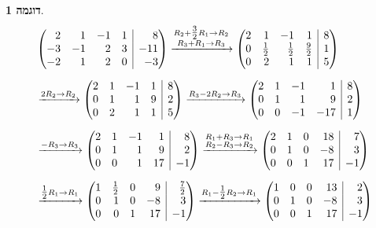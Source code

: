 \documentclass[12pt]{report}
\theoremstyle{plain}
\theoremstyle{definition}
\newtheorem{example}{דוגמה}[chapter]
\newcommand{\0}{\mathbf{0}}
\begin{document}
\begin{example}
$$
\begin{aligned}
&\left(\begin{array}{@{}rrrr|r@{}}
2 & 1 & -1 & 1 & 8 \\
-3 & -1 & 2 & 3 & -11 \\
-2 & 1 & 2 & 0 & -3
\end{array}\right)
\xrightarrow{\substack{R_2 + \tfrac{3}{2} R_1 \to R_2 \\ R_3 + R_1 \to R_3}}
\left(\begin{array}{@{}rrrr|r@{}}
2 & 1 & -1 & 1 & 8 \\
0 & \tfrac{1}{2} & \tfrac{1}{2} & \tfrac{9}{2} & 1 \\
0 & 2 & 1 & 1 & 5
\end{array}\right) \\[6pt]
&\xrightarrow{2 R_2 \to R_2}
\left(\begin{array}{@{}rrrr|r@{}}
2 & 1 & -1 & 1 & 8 \\
0 & 1 & 1 & 9 & 2 \\
0 & 2 & 1 & 1 & 5
\end{array}\right)
\xrightarrow{R_3 - 2 R_2 \to R_3}
\left(\begin{array}{@{}rrrr|r@{}}
2 & 1 & -1 & 1 & 8 \\
0 & 1 & 1 & 9 & 2 \\
0 & 0 & -1 & -17 & 1
\end{array}\right) \\[6pt]
&\xrightarrow{-R_3 \to R_3}
\left(\begin{array}{@{}rrrr|r@{}}
2 & 1 & -1 & 1 & 8 \\
0 & 1 & 1 & 9 & 2 \\
0 & 0 & 1 & 17 & -1
\end{array}\right)
\xrightarrow{\substack{R_1 + R_3 \to R_1 \\ R_2 - R_3 \to R_2}}
\left(\begin{array}{@{}rrrr|r@{}}
2 & 1 & 0 & 18 & 7 \\
0 & 1 & 0 & -8 & 3 \\
0 & 0 & 1 & 17 & -1
\end{array}\right) \\[6pt]
&\xrightarrow{\tfrac{1}{2} R_1 \to R_1}
\left(\begin{array}{@{}rrrr|r@{}}
1 & \tfrac{1}{2} & 0 & 9 & \tfrac{7}{2} \\
0 & 1 & 0 & -8 & 3 \\
0 & 0 & 1 & 17 & -1
\end{array}\right)
\xrightarrow{R_1 - \tfrac{1}{2} R_2 \to R_1}
\left(\begin{array}{@{}rrrr|r@{}}
1 & 0 & 0 & 13 & 2 \\
0 & 1 & 0 & -8 & 3 \\
0 & 0 & 1 & 17 & -1
\end{array}\right)
\end{aligned}
$$


\end{example}
\end{document}
